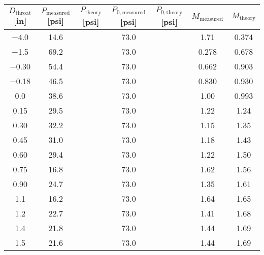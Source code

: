 \begin{tabular}{ccccccc}
\toprule
$D_\text{throat}$ [\unit{in}] & $P_\text{measured}$ [\unit{psi}] & $P_\text{theory}$ [\unit{psi}] & $P_{0,\text{measured}}$ [\unit{psi}] & $P_{0,\text{theory}}$ [\unit{psi}] & $M_\text{measured}$ & $M_\text{theory}$ \\
\midrule
\num{-4.0} & \num{14.6} &  & \num{73.0} &  & \num{1.71} & \num{0.374} \\ 
\num{-1.5} & \num{69.2} &  & \num{73.0} &  & \num{0.278} & \num{0.678} \\ 
\num{-0.30} & \num{54.4} &  & \num{73.0} &  & \num{0.662} & \num{0.903} \\ 
\num{-0.18} & \num{46.5} &  & \num{73.0} &  & \num{0.830} & \num{0.930} \\ 
\num{0.0} & \num{38.6} &  & \num{73.0} &  & \num{1.00} & \num{0.993} \\ 
\num{0.15} & \num{29.5} &  & \num{73.0} &  & \num{1.22} & \num{1.24} \\ 
\num{0.30} & \num{32.2} &  & \num{73.0} &  & \num{1.15} & \num{1.35} \\ 
\num{0.45} & \num{31.0} &  & \num{73.0} &  & \num{1.18} & \num{1.43} \\ 
\num{0.60} & \num{29.4} &  & \num{73.0} &  & \num{1.22} & \num{1.50} \\ 
\num{0.75} & \num{16.8} &  & \num{73.0} &  & \num{1.62} & \num{1.56} \\ 
\num{0.90} & \num{24.7} &  & \num{73.0} &  & \num{1.35} & \num{1.61} \\ 
\num{1.1} & \num{16.2} &  & \num{73.0} &  & \num{1.64} & \num{1.65} \\ 
\num{1.2} & \num{22.7} &  & \num{73.0} &  & \num{1.41} & \num{1.68} \\ 
\num{1.4} & \num{21.8} &  & \num{73.0} &  & \num{1.44} & \num{1.69} \\ 
\num{1.5} & \num{21.6} &  & \num{73.0} &  & \num{1.44} & \num{1.69} \\ 
\bottomrule
\end{tabular}